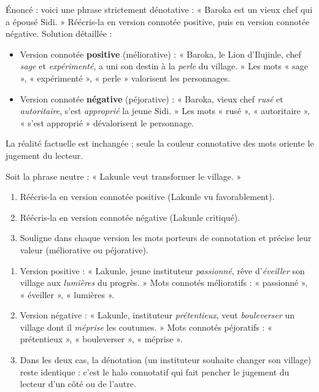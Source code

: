 \documentclass[11pt]{article}
\begin{document}
\begin{exoresolu}
Énoncé : voici une phrase strictement dénotative : « Baroka est un vieux chef qui a épousé Sidi. » Réécris-la en version connotée positive, puis en version connotée négative.
\tcblower
Solution détaillée :
\begin{itemize}
\item Version connotée \textbf{positive} (méliorative) : « Baroka, le Lion d'Ilujinle, chef \emph{sage} et \emph{expérimenté}, a uni son destin à la \emph{perle} du village. » Les mots « sage », « expérimenté », « perle » valorisent les personnages.
\item Version connotée \textbf{négative} (péjorative) : « Baroka, vieux chef \emph{rusé} et \emph{autoritaire}, s'est \emph{approprié} la jeune Sidi. » Les mots « rusé », « autoritaire », « s'est approprié » dévalorisent le personnage.
\end{itemize}
La réalité factuelle est inchangée ; seule la couleur connotative des mots oriente le jugement du lecteur.
\end{exoresolu}

\begin{exercice}
Soit la phrase neutre : « Lakunle veut transformer le village. »
\begin{enumerate}
\item Réécris-la en version connotée positive (Lakunle vu favorablement).
\item Réécris-la en version connotée négative (Lakunle critiqué).
\item Souligne dans chaque version les mots porteurs de connotation et précise leur valeur (méliorative ou péjorative).
\end{enumerate}
\end{exercice}

\begin{corrige}[Exercice]
\begin{enumerate}
\item Version positive : « Lakunle, jeune instituteur \emph{passionné}, rêve d'\emph{éveiller} son village aux \emph{lumières} du progrès. » Mots connotés mélioratifs : « passionné », « éveiller », « lumières ».
\item Version négative : « Lakunle, instituteur \emph{prétentieux}, veut \emph{bouleverser} un village dont il \emph{méprise} les coutumes. » Mots connotés péjoratifs : « prétentieux », « bouleverser », « méprise ».
\item Dans les deux cas, la dénotation (un instituteur souhaite changer son village) reste identique : c'est le halo connotatif qui fait pencher le jugement du lecteur d'un côté ou de l'autre.
\end{enumerate}
\end{corrige}
\end{document}
